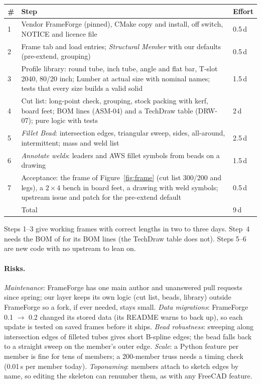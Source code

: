 \begin{center}
\small
\begin{tabularx}{\linewidth}{@{}lXl@{}}
\toprule
\# & Step & Effort\\
\midrule
1 & Vendor FrameForge (pinned), CMake copy and install, off switch, NOTICE and licence file & 0.5\,d\\
2 & Frame tab and load entries; \emph{Structural Member} with our defaults (pre-extend, grouping) & 0.5\,d\\
3 & Profile library: round tube, inch tube, angle and flat bar, T-slot 2040, 80/20 inch; Lumber at actual size with
  nominal names; tests that every size builds a valid solid & 1.5\,d\\
4 & Cut list: long-point check, grouping, stock packing with kerf, board feet; BOM lines (ASM-04) and a TechDraw
  table (DRW-07); pure logic with tests & 2\,d\\
5 & \emph{Fillet Bead}: intersection edges, triangular sweep, sides, all-around, intermittent; mass and weld list & 2.5\,d\\
6 & \emph{Annotate welds}: leaders and AWS fillet symbols from beads on a drawing & 1.5\,d\\
7 & Acceptance: the frame of Figure~\ref{fig:frame} (cut list 300/200 and legs), a $2\times4$ bench in board feet,
  a drawing with weld symbols; upstream issue and patch for the pre-extend default & 0.5\,d\\
\midrule
 & Total & 9\,d\\
\bottomrule
\end{tabularx}
\end{center}
Steps 1--3 give working frames with correct lengths in two to three days. Step~4 needs the BOM of  for its
BOM lines (the TechDraw table does not). Steps 5--6 are new code with no upstream to lean on.

\paragraph{Risks.} \emph{Maintenance}: FrameForge has one main author and unanswered pull requests since spring; our
layer keeps its own logic (cut list, beads, library) outside FrameForge so a fork, if ever needed, stays small.
\emph{Data migrations}: FrameForge 0.1 $\rightarrow$ 0.2 changed its stored data (its README warns to back up), so each
update is tested on saved frames before it ships. \emph{Bead robustness}: sweeping along intersection edges of filleted
tubes gives short B-spline edges; the bead falls back to a straight sweep on the member's outer edge. \emph{Scale}: a
Python feature per member is fine for tens of members; a 200-member truss needs a timing check (0.01\,s per member
today). \emph{Toponaming}: members attach to sketch edges by name, so editing the skeleton can renumber them, as with
any FreeCAD feature.

